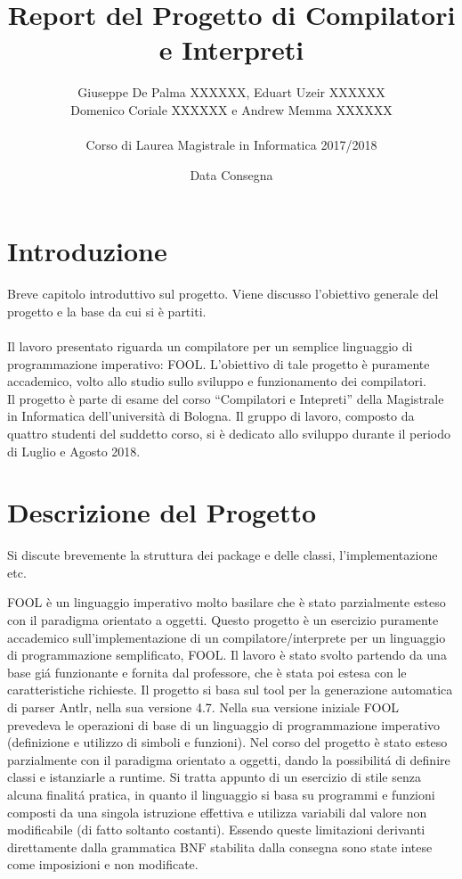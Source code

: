 \documentclass{scrreprt}
\title{Report del Progetto di Compilatori e Interpreti}
\date{Data Consegna}
\author{Giuseppe De Palma XXXXXX, Eduart Uzeir XXXXXX\\ Domenico Coriale XXXXXX e Andrew Memma XXXXXX\\
\\Corso di Laurea Magistrale in Informatica 2017/2018}
\begin{document}
\maketitle

\tableofcontents

\chapter{Introduzione}
Breve capitolo introduttivo sul progetto. Viene discusso l'obiettivo generale del progetto 
e la base da cui si è partiti.\\
\\
Il lavoro presentato riguarda un compilatore per un semplice linguaggio di programmazione imperativo: FOOL.
L'obiettivo di tale progetto è puramente accademico, volto allo studio sullo sviluppo e funzionamento dei compilatori.\\
Il progetto è parte di esame del corso ``Compilatori e Intepreti'' della Magistrale in Informatica dell'università di Bologna.
Il gruppo di lavoro, composto da quattro studenti del suddetto corso, si è dedicato allo sviluppo durante il periodo
di Luglio e Agosto 2018.

\chapter{Descrizione del Progetto}
Si discute brevemente la struttura dei package e delle classi, l'implementazione etc.

FOOL è un linguaggio imperativo molto basilare che è stato parzialmente esteso con il paradigma orientato a oggetti.
Questo progetto è un esercizio puramente accademico sull’implementazione di un
compilatore/interprete per un linguaggio di programmazione semplificato, FOOL. Il
lavoro è stato svolto partendo da una base giá funzionante e fornita dal professore,
che è stata poi estesa con le caratteristiche richieste. Il progetto si basa sul tool per
la generazione automatica di parser Antlr, nella sua versione 4.7.
Nella sua versione iniziale FOOL prevedeva le operazioni di base di un linguaggio di
programmazione imperativo (definizione e utilizzo di simboli e funzioni). Nel corso del
progetto è stato esteso parzialmente con il paradigma orientato a oggetti, dando la
possibilitá di definire classi e istanziarle a runtime.
Si tratta appunto di un esercizio di stile senza alcuna finalitá pratica, in quanto il
linguaggio si basa su programmi e funzioni composti da una singola istruzione
effettiva e utilizza variabili dal valore non modificabile (di fatto soltanto costanti).
Essendo queste limitazioni derivanti direttamente dalla grammatica BNF stabilita
dalla consegna sono state intese come imposizioni e non modificate.
\end{document}
